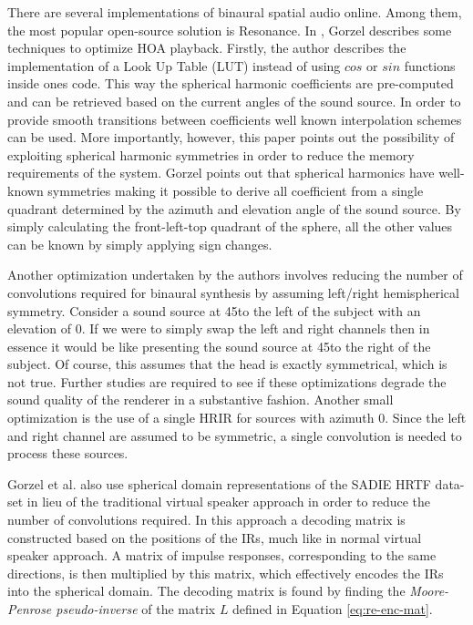 There are several implementations of binaural spatial audio online. Among them, the most popular open-source solution is Resonance. In \cite{gorzel2019efficient}, Gorzel describes some techniques to optimize HOA playback. Firstly, the author describes the implementation of a Look Up Table (LUT) instead of using $cos$ or $sin$ functions inside ones code. This way the spherical harmonic coefficients are pre-computed and can be retrieved based on the current angles of the sound source. In order to provide smooth transitions between coefficients well known interpolation schemes can be used. More importantly, however, this paper points out the possibility of exploiting spherical harmonic symmetries in order to reduce the memory requirements of the system. Gorzel points out that spherical harmonics have well-known symmetries making it possible to derive all coefficient from a single quadrant determined by the azimuth and elevation angle of the sound source. By simply calculating the front-left-top quadrant of the sphere, all the other values can be known by simply applying sign changes. 

Another optimization undertaken by the authors involves reducing the number of convolutions required for binaural synthesis by assuming left/right hemispherical symmetry. Consider a sound source at 45\textdegree to the left of the subject with an elevation of 0\textdegree. If we were to simply swap the left and right channels then in essence it would be like presenting the sound source at 45\textdegree to the right of the subject. Of course, this assumes that the head is exactly symmetrical, which is not true. Further studies are required to see if these optimizations degrade the sound quality of the renderer in a substantive fashion. Another small optimization is the use of a single HRIR for sources with azimuth 0. Since the left and right channel are assumed to be symmetric, a single convolution is needed to process these sources. 

Gorzel et al. also use spherical domain representations of the SADIE HRTF data-set in lieu of the traditional virtual speaker approach in order to reduce the number of convolutions required. In this approach a decoding matrix is constructed based on the positions of the IRs, much like in normal virtual speaker approach. A matrix of impulse responses, corresponding to the same directions, is then multiplied by this matrix, which effectively encodes the IRs into the spherical domain. The decoding matrix is found by finding the \textit{Moore-Penrose pseudo-inverse} of the matrix $L$ defined in Equation \ref{eq:re-enc-mat}. 

